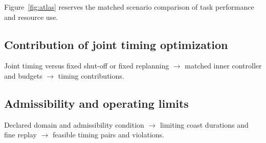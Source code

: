 \documentclass[letterpaper,10pt,conference]{ieeeconf}
\begin{document}
Figure~\ref{fig:atlas} reserves the matched scenario comparison of task performance and resource use.

% 

\subsection{Contribution of joint timing optimization}
\label{sec:results-timing}
Joint timing versus fixed shut-off or fixed replanning $\rightarrow$ matched inner controller and budgets $\rightarrow$ timing contributions.

\subsection{Admissibility and operating limits}
\label{sec:results-admissibility}
Declared domain and admissibility condition $\rightarrow$ limiting coast durations and fine replay $\rightarrow$ feasible timing pairs and violations.

\nocite{heemels2012}


\end{document}
